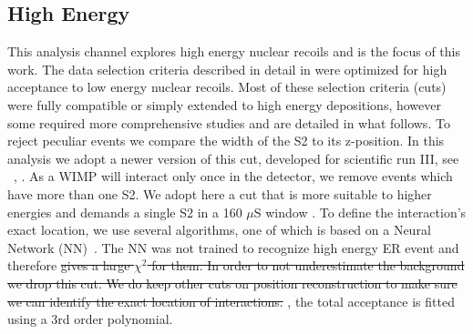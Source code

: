 \subsection{High Energy}
\label{subsubsec:HighE}
This analysis channel explores high energy nuclear recoils and is the focus of this work. The data selection criteria described in detail in \cite{Aprile:2012vw} were optimized for high 
acceptance to low energy nuclear recoils.
Most of these selection criteria (cuts) were fully compatible or simply extended to high energy depositions, however some required
more comprehensive studies and are detailed in what follows. To reject peculiar events we compare the width of the S2 to its z-position. In this analysis we adopt a newer version of this cut, developed for scientific run III, see ~\cite{xe100_run_combination},  . As a WIMP will interact only once in the detector, we remove events which have more than one S2. We adopt here a cut that is more suitable to higher energies and demands a single S2 in a 160 $\mu$S window  . To define the interaction's exact location, we use several algorithms, one of which is based on a Neural Network (NN)~\cite{Aprile:2012vw}. The NN was not trained to recognize high energy ER event and therefore   
\sout{gives a large $\chi^2$ for them. In order to not underestimate the background we drop this cut. We do keep other cuts on position reconstruction to make sure we can identify the exact location of interactions.} 
 , the total acceptance is fitted using a 3rd order polynomial.

